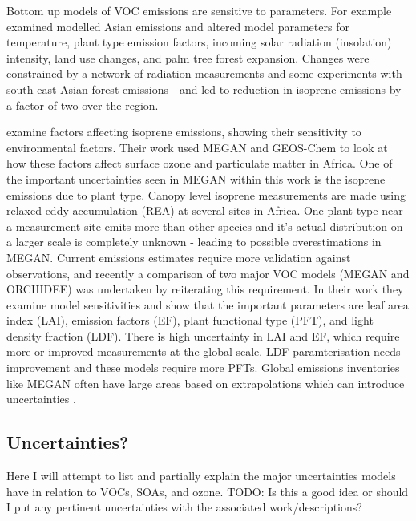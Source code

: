     Bottom up models of VOC emissions are sensitive to parameters.
    For example \cite{Stavrakou2014} examined modelled Asian emissions and altered model parameters for temperature, plant type emission factors, incoming solar radiation (insolation) intensity, land use changes, and palm tree forest expansion.
    Changes were constrained by a network of radiation measurements and some experiments with south east Asian forest emissions - and led to reduction in isoprene emissions by a factor of two over the region.
    
    
    
    \cite{Marais2014} examine factors affecting isoprene emissions, showing their sensitivity to environmental factors.
    Their work used MEGAN \citep{Guenther1995} and GEOS-Chem to look at how these factors affect surface ozone and particulate matter in Africa.
    One of the important uncertainties seen in MEGAN within this work is the isoprene emissions due to plant type.
    Canopy level isoprene measurements are made using relaxed eddy accumulation (REA) at several sites in Africa.
    One plant type near a measurement site emits more than other species and it's actual distribution on a larger scale is completely unknown - leading to possible overestimations in MEGAN.
    Current emissions estimates require more validation against observations, and recently a comparison of two major VOC models (MEGAN and ORCHIDEE) was undertaken by \cite{Messina2016} reiterating this requirement.
    In their work they examine model sensitivities and show that the important parameters are leaf area index (LAI), emission factors (EF), plant functional type (PFT), and light density fraction (LDF).
    There is high uncertainty in LAI and EF, which require more or improved measurements at the global scale.
    LDF paramterisation needs improvement and these models require more PFTs.
    Global emissions inventories like MEGAN often have large areas based on extrapolations which can introduce uncertainties \citep{Miller2014}.
  
  
  \subsection{Uncertainties?}
  \label{LR:Models:Uncert}
    
    Here I will attempt to list and partially explain the major uncertainties models have in relation to  VOCs, SOAs, and ozone. 
    TODO: Is this a good idea or should I put any pertinent uncertainties with the associated work/descriptions?
    
